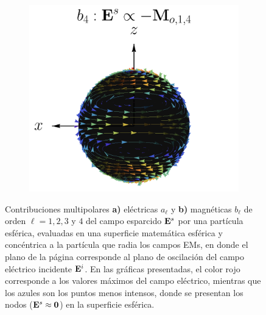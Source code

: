 \begin{figure}[h!]
\begin{subfigure}{.9\linewidth}
		\includegraphics[scale=.25]{1-Teoria/figs/Mo14_static_crop.png}%
		\end{subfigure}
		\caption{Contribuciones multipolares \textbf{a)} eléctricas $a_\ell$ y \textbf{b)} magnéticas $b_\ell$ de orden $\ell = 1,2,3$ y $4$ del campo esparcido $\vb{E}^s$ por una partícula esférica, evaluadas en una superficie matemática esférica y concéntrica a la partícula que radia los campos EMs, en donde el plano de la página corresponde al plano de oscilación del campo eléctrico incidente $\vb{E}^i$. En las gráficas presentadas, el color rojo corresponde a los valores máximos del campo eléctrico, mientras que los azules son los puntos menos intensos, donde se presentan los nodos ($\vb{E}^s\approx \vb{0}$) en la superficie esférica.}
		\label{fig:Multipolos}
	\end{figure}

